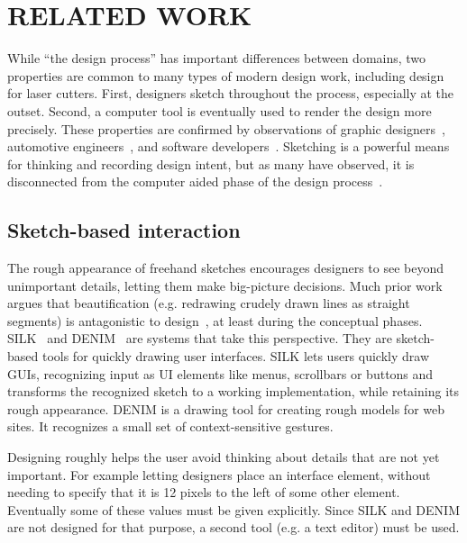 \documentclass{article}
\begin{document}
\section{RELATED WORK}

While ``the design process'' has important differences between
domains, two properties are common to many types of modern design
work, including design for laser cutters. First, designers sketch
throughout the process, especially at the outset. Second, a computer
tool is eventually used to render the design more precisely. These
properties are confirmed by observations of graphic
designers~\cite{wong-rr-prototypes}, automotive
engineers~\cite{kara-styling}, and software
developers~\cite{dekel-improvised-notation}. Sketching is a powerful
means for thinking and recording design intent, but as many have
observed, it is disconnected from the computer aided phase of the
design process~\cite{company-sketching-in-engineering}.

\subsection{Sketch-based interaction}

The rough appearance of freehand sketches encourages designers to see
beyond unimportant details, letting them make big-picture
decisions. Much prior work argues that beautification (e.g. redrawing
crudely drawn lines as straight segments) is antagonistic to
design~\cite{gross-cocktail}, at least during the conceptual
phases. SILK~\cite{landay-silk-chi} and DENIM~\cite{lin-denim} are
systems that take this perspective. They are sketch-based tools for
quickly drawing user interfaces. SILK lets users quickly draw GUIs,
recognizing input as UI elements like menus, scrollbars or buttons and
transforms the recognized sketch to a working implementation, while
retaining its rough appearance. DENIM is a drawing tool for creating
rough models for web sites. It recognizes a small set of
context-sensitive gestures.

Designing roughly helps the user avoid thinking about details that are
not yet important. For example letting designers place an interface
element, without needing to specify that it is 12 pixels to the left
of some other element. Eventually some of these values must be given
explicitly. Since SILK and DENIM are not designed for that purpose, a
second tool (e.g. a text editor) must be used.

\end{document}
